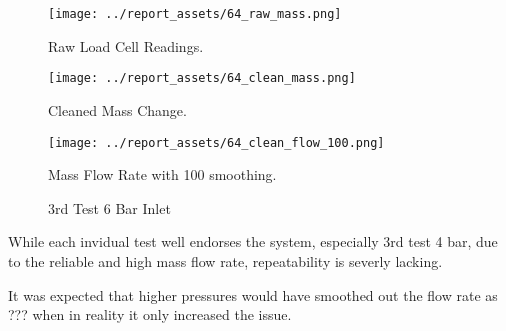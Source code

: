 \begin{figure}[htbp]
    \centering

    \begin{minipage}{0.3\textwidth}
        \centering
        \texttt{[image: ../report\_assets/64\_raw\_mass.png]}
        \caption*{Raw Load Cell Readings.}
    \end{minipage}
    \hfill
    \begin{minipage}{0.3\textwidth}
        \centering
        \texttt{[image: ../report\_assets/64\_clean\_mass.png]}
        \caption*{Cleaned Mass Change.}
    \end{minipage}
    \hfill
    \begin{minipage}{0.3\textwidth}
        \centering
        \texttt{[image: ../report\_assets/64\_clean\_flow\_100.png]}
        \caption*{Mass Flow Rate with 100 smoothing.}
    \end{minipage}
    \caption{3rd Test 6 Bar Inlet}
    
\end{figure}\label{fig:64}
While each invidual test well endorses the system, especially 3rd test 4 bar, due to the reliable and high mass flow rate, repeatability is severly lacking.

It was expected that higher pressures would have smoothed out the flow rate as ??? when in reality it only increased the issue. 